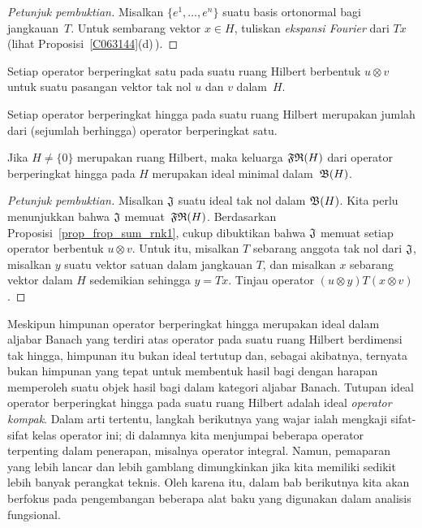 \begin{proof}[\emph{Petunjuk pembuktian}] Misalkan $\{e^1, \dots, e^n\}$ suatu basis ortonormal bagi jangkauan~$T$. Untuk
sembarang vektor $x \in H$, tuliskan \emph{ekspansi Fourier} dari $Tx$ (lihat Proposisi~\ref{C063144}(d)\,).  \ns
\end{proof}

\begin{cor} Setiap operator berperingkat satu pada suatu ruang Hilbert berbentuk $u \otimes v$ untuk suatu pasangan vektor tak nol
$u$ dan $v$ dalam~$H$.
\end{cor}

\begin{cor} Setiap operator berperingkat hingga pada suatu ruang Hilbert merupakan jumlah dari (sejumlah berhingga) operator berperingkat satu.
\end{cor}

\begin{prop} Jika $H \ne \{0\}$ merupakan ruang Hilbert, maka keluarga $\mathfrak{FR}(H)$ dari operator berperingkat hingga pada $H$
merupakan ideal minimal dalam~$\mathfrak{B}(H)$.
\end{prop}

\begin{proof}[\emph{Petunjuk pembuktian}] Misalkan $\mathfrak{J}$ suatu ideal tak nol dalam $\mathfrak{B}(H)$. Kita perlu menunjukkan bahwa $\mathfrak{J}$
memuat~$\mathfrak{FR}(H)$. Berdasarkan Proposisi~\ref{prop_frop_sum_rnk1}, cukup dibuktikan bahwa $\mathfrak{J}$ memuat setiap
operator berbentuk $u \otimes v$. Untuk itu, misalkan $T$ sebarang anggota tak nol dari $\mathfrak{J}$, misalkan $y$ suatu vektor satuan dalam
jangkauan $T$, dan misalkan $x$ sebarang vektor dalam $H$ sedemikian sehingga $y = Tx$. Tinjau operator $(u \otimes y)T(x \otimes v)$. \ns
\end{proof}

Meskipun himpunan operator berperingkat hingga merupakan ideal dalam aljabar Banach yang terdiri atas operator pada suatu ruang Hilbert berdimensi tak hingga, himpunan itu bukan ideal
tertutup dan, sebagai akibatnya, ternyata bukan himpunan yang tepat untuk membentuk hasil bagi dengan harapan memperoleh suatu objek hasil bagi dalam
kategori aljabar Banach. Tutupan ideal operator berperingkat hingga pada suatu ruang Hilbert adalah ideal \emph{operator
kompak}. Dalam arti tertentu, langkah berikutnya yang wajar ialah mengkaji sifat-sifat kelas operator ini; di dalamnya kita menjumpai
beberapa operator terpenting dalam penerapan, misalnya operator integral. Namun, pemaparan yang lebih lancar dan lebih gamblang
dimungkinkan jika kita memiliki sedikit lebih banyak perangkat teknis. Oleh karena itu, dalam bab berikutnya kita akan berfokus pada
pengembangan beberapa alat baku yang digunakan dalam analisis fungsional.
























\endinput
